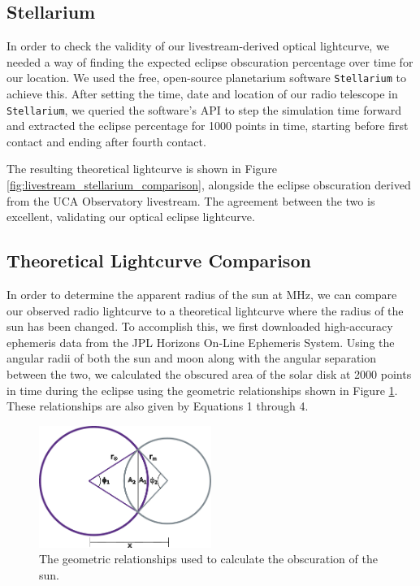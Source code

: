\subsection{\label{sec:stellarium}Stellarium}

In order to check the validity of our livestream-derived optical lightcurve, we needed a way of finding the expected eclipse obscuration percentage over time for our location.
We used the free, open-source planetarium software \texttt{Stellarium} to achieve this.
After setting the time, date and location of our radio telescope in \texttt{Stellarium}, we queried the software's API to step the simulation time forward and extracted the eclipse percentage for 1000 points in time, starting before first contact and ending after fourth contact.

The resulting theoretical lightcurve is shown in Figure \ref{fig:livestream_stellarium_comparison}, alongside the eclipse obscuration derived from the UCA Observatory livestream.
The agreement between the two is excellent, validating our optical eclipse lightcurve.


\subsection{\label{sec:theoreticalLightcurves}Theoretical Lightcurve Comparison}

In order to determine the apparent radius of the sun at \unit[1420]{MHz}, we can compare our observed radio lightcurve to a theoretical lightcurve where the radius of the sun has been changed.
To accomplish this, we first downloaded high-accuracy ephemeris data from the JPL Horizons On-Line Ephemeris System. 
Using the angular radii of both the sun and moon along with the angular separation between the two, we calculated the obscured area of the solar disk at 2000 points in time during the eclipse using the geometric relationships shown in Figure \ref{fig:eclipse_geometry}.
These relationships are also given by Equations 1 through 4.

\begin{figure}
  \includegraphics[width=0.5\textwidth]{figures/drawing}
  \caption{\label{fig:eclipse_geometry} The geometric relationships used to calculate the obscuration of the sun.}
\end{figure}

